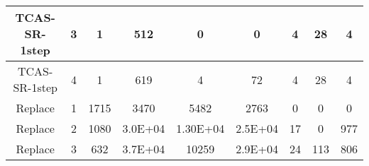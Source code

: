 \begin{table*}[]
\begin{tabular}{@{}ccccccccc@{}}
        TCAS-SR-1step                                               & 3                                                            & 1                                                          & 512                                                         & 0                                                              & 0                                                              & 4                                                          & 28                                                            & 4        \\ \midrule
        TCAS-SR-1step                                               & 4                                                            & 1                                                          & 619                                                         & 4                                                              & 72                                                             & 4                                                          & 28                                                            & 4        \\ \midrule
        Replace                                                     & 1                                                            & 1715                                                       & 3470                                                        & 5482                                                           & 2763                                                           & 0                                                          & 0                                                             & 0        \\ \midrule
        Replace                                                     & 2                                                            & 1080                                                       & 3.0E+04                                                     & 1.30E+04                                                       & 2.5E+04                                                        & 17                                                         & 0                                                             & 977      \\ \midrule
        Replace                                                     & 3                                                            & 632                                                        & 3.7E+04                                                     & 10259                                                          & 2.9E+04                                                        & 24                                                         & 113                                                           & 806      \\ \midrule

\end{tabular}
\end{table*}
